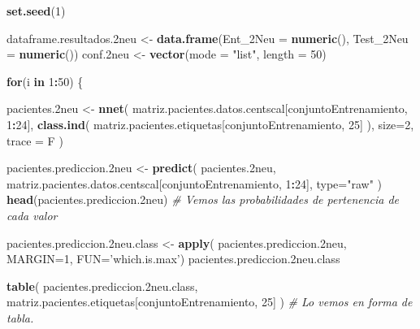 \documentclass[]{article}
\newenvironment{Shaded}{\begin{snugshade}}{\end{snugshade}}
\newcommand{\CommentTok}[1]{\textcolor[rgb]{0.56,0.35,0.01}{\textit{#1}}}
\newcommand{\ControlFlowTok}[1]{\textcolor[rgb]{0.13,0.29,0.53}{\textbf{#1}}}
\newcommand{\DataTypeTok}[1]{\textcolor[rgb]{0.13,0.29,0.53}{#1}}
\newcommand{\DecValTok}[1]{\textcolor[rgb]{0.00,0.00,0.81}{#1}}
\newcommand{\FloatTok}[1]{\textcolor[rgb]{0.00,0.00,0.81}{#1}}
\newcommand{\KeywordTok}[1]{\textcolor[rgb]{0.13,0.29,0.53}{\textbf{#1}}}
\newcommand{\NormalTok}[1]{#1}
\newcommand{\OperatorTok}[1]{\textcolor[rgb]{0.81,0.36,0.00}{\textbf{#1}}}
\newcommand{\StringTok}[1]{\textcolor[rgb]{0.31,0.60,0.02}{#1}}
\begin{document}
\begin{Shaded}
\begin{Highlighting}[]
\KeywordTok{set.seed}\NormalTok{(}\DecValTok{1}\NormalTok{)}

\NormalTok{dataframe.resultados}\FloatTok{.2}\NormalTok{neu <-}\StringTok{ }\KeywordTok{data.frame}\NormalTok{(}\DataTypeTok{Ent_2Neu =} \KeywordTok{numeric}\NormalTok{(),}
                                        \DataTypeTok{Test_2Neu =} \KeywordTok{numeric}\NormalTok{())}
\NormalTok{conf}\FloatTok{.2}\NormalTok{neu <-}\StringTok{ }\KeywordTok{vector}\NormalTok{(}\DataTypeTok{mode =} \StringTok{"list"}\NormalTok{, }\DataTypeTok{length =} \DecValTok{50}\NormalTok{)}
  
\ControlFlowTok{for}\NormalTok{(i }\ControlFlowTok{in} \DecValTok{1}\OperatorTok{:}\DecValTok{50}\NormalTok{)}
\NormalTok{\{}

\NormalTok{  pacientes}\FloatTok{.2}\NormalTok{neu <-}\StringTok{ }\KeywordTok{nnet}\NormalTok{( matriz.pacientes.datos.centscal[conjuntoEntrenamiento, }\DecValTok{1}\OperatorTok{:}\DecValTok{24}\NormalTok{],}
                          \KeywordTok{class.ind}\NormalTok{( matriz.pacientes.etiquetas[conjuntoEntrenamiento, }\DecValTok{25}\NormalTok{] ),}
                          \DataTypeTok{size=}\DecValTok{2}\NormalTok{,}
                          \DataTypeTok{trace =}\NormalTok{ F )}
  
\NormalTok{  pacientes.prediccion}\FloatTok{.2}\NormalTok{neu <-}\StringTok{ }\KeywordTok{predict}\NormalTok{( pacientes}\FloatTok{.2}\NormalTok{neu,}
\NormalTok{                                        matriz.pacientes.datos.centscal[conjuntoEntrenamiento, }\DecValTok{1}\OperatorTok{:}\DecValTok{24}\NormalTok{],}
                                        \DataTypeTok{type=}\StringTok{"raw"}\NormalTok{ )}
  \KeywordTok{head}\NormalTok{(pacientes.prediccion}\FloatTok{.2}\NormalTok{neu) }\CommentTok{# Vemos las probabilidades de pertenencia de cada valor}
  
\NormalTok{  pacientes.prediccion}\FloatTok{.2}\NormalTok{neu.class <-}\StringTok{ }\KeywordTok{apply}\NormalTok{( pacientes.prediccion}\FloatTok{.2}\NormalTok{neu, }\DataTypeTok{MARGIN=}\DecValTok{1}\NormalTok{, }\DataTypeTok{FUN=}\StringTok{'which.is.max'}\NormalTok{)}
\NormalTok{  pacientes.prediccion}\FloatTok{.2}\NormalTok{neu.class}
  
  
  \KeywordTok{table}\NormalTok{( pacientes.prediccion}\FloatTok{.2}\NormalTok{neu.class, matriz.pacientes.etiquetas[conjuntoEntrenamiento, }\DecValTok{25}\NormalTok{] )  }\CommentTok{# Lo vemos en forma de tabla.}
  

\end{Highlighting}
\end{Shaded}
\end{document}
